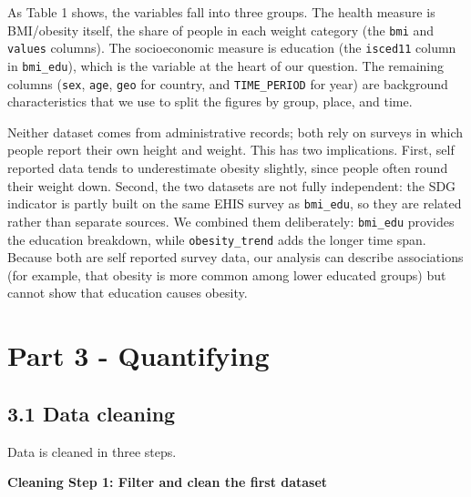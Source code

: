 \documentclass[
]{article}
\begin{document}
As Table 1 shows, the variables fall into three groups. The health
measure is BMI/obesity itself, the share of people in each weight
category (the \texttt{bmi} and \texttt{values} columns). The
socioeconomic measure is education (the \texttt{isced11} column in
\texttt{bmi\_edu}), which is the variable at the heart of our question.
The remaining columns (\texttt{sex}, \texttt{age}, \texttt{geo} for
country, and \texttt{TIME\_PERIOD} for year) are background
characteristics that we use to split the figures by group, place, and
time.

Neither dataset comes from administrative records; both rely on surveys
in which people report their own height and weight. This has two
implications. First, self reported data tends to underestimate obesity
slightly, since people often round their weight down. Second, the two
datasets are not fully independent: the SDG indicator is partly built on
the same EHIS survey as \texttt{bmi\_edu}, so they are related rather
than separate sources. We combined them deliberately: \texttt{bmi\_edu}
provides the education breakdown, while \texttt{obesity\_trend} adds the
longer time span. Because both are self reported survey data, our
analysis can describe associations (for example, that obesity is more
common among lower educated groups) but cannot show that education
causes obesity.

\section{Part 3 - Quantifying}\label{part-3---quantifying}

\subsection{3.1 Data cleaning}\label{data-cleaning}

Data is cleaned in three steps.

\textbf{Cleaning Step 1: Filter and clean the first dataset}
\end{document}
